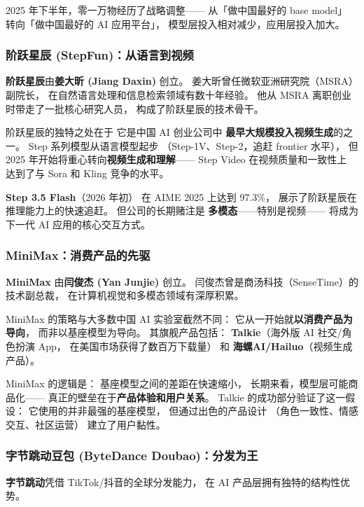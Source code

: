 2025 年下半年，零一万物经历了战略调整——
从「做中国最好的 base model」
转向「做中国最好的 AI 应用平台」，
模型层投入相对减少，应用层投入加大。

\subsubsection{阶跃星辰 (StepFun)：从语言到视频}

\textbf{阶跃星辰}由\textbf{姜大昕 (Jiang Daxin)} 创立。
姜大昕曾任微软亚洲研究院（MSRA）副院长，
在自然语言处理和信息检索领域有数十年经验。
他从 MSRA 离职创业时带走了一批核心研究人员，
构成了阶跃星辰的技术骨干。

阶跃星辰的独特之处在于
它是中国 AI 创业公司中
\textbf{最早大规模投入视频生成}的之一。
Step 系列模型从语言模型起步
（Step-1V、Step-2，追赶 frontier 水平），
但 2025 年开始将重心转向\textbf{视频生成和理解}——
Step Video 在视频质量和一致性上
达到了与 Sora 和 Kling 竞争的水平。

\textbf{Step 3.5 Flash}（2026 年初）
在 AIME 2025 上达到 97.3\%，
展示了阶跃星辰在推理能力上的快速追赶。
但公司的长期赌注是
\textbf{多模态}——特别是视频——
将成为下一代 AI 应用的核心交互方式。

\subsubsection{MiniMax：消费产品的先驱}

\textbf{MiniMax} 由\textbf{闫俊杰 (Yan Junjie)} 创立。
闫俊杰曾是商汤科技（SenseTime）的技术副总裁，
在计算机视觉和多模态领域有深厚积累。

MiniMax 的策略与大多数中国 AI 实验室截然不同：
它从一开始就\textbf{以消费产品为导向}，
而非以基座模型为导向。
其旗舰产品包括：
\textbf{Talkie}（海外版 AI 社交/角色扮演 App，
在美国市场获得了数百万下载量）
和 \textbf{海螺AI/Hailuo}（视频生成产品）。

MiniMax 的逻辑是：
基座模型之间的差距在快速缩小，
长期来看，模型层可能商品化——
真正的壁垒在于\textbf{产品体验和用户关系}。
Talkie 的成功部分验证了这一假设：
它使用的并非最强的基座模型，
但通过出色的产品设计
（角色一致性、情感交互、社区运营）
建立了用户黏性。

\subsubsection{字节跳动豆包 (ByteDance Doubao)：分发为王}

\textbf{字节跳动}凭借 TikTok/抖音的全球分发能力，
在 AI 产品层拥有独特的结构性优势。

